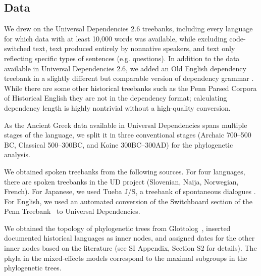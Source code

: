 \documentclass[9pt,twocolumn,twoside,lineno]{pnas-new}
\begin{document}
{%




\subsection*{Data}
We drew on the Universal Dependencies 2.6 treebanks, including every language for which data with at least 10,000 words was available, while excluding code-switched text, text produced entirely by nonnative speakers, and text only reflecting specific types of sentences (e.g. questions).
In addition to the data available in Universal Dependencies 2.6, we added an Old English dependency treebank in a slightly different but comparable version of dependency grammar \citep{bech2014iswoc}.
While there are some other historical treebanks such as the Penn Parsed Corpora of Historical English \citep{kroch2011penn} they are not in the dependency format; calculating dependency length is highly nontrivial without a high-quality conversion.

As the Ancient Greek data available in Universal Dependencies spans multiple stages of the language, we split it in three conventional stages (Archaic 700--500 BC, Classical 500--300BC, and Koine 300BC--300AD) for the phylogenetic analysis. 


We obtained spoken treebanks from the following sources.
For four languages, there are spoken treebanks in the UD project (Slovenian, Naija, Norwegian, French). For Japanese, we used Tueba J/S, a treebank of spontaneous dialogues \citep{hall2006conll}. For English, we used an automated conversion \citep{schuster2018sentences} of the Switchboard section of the Penn Treebank~\citep{marcus-building-1993} to Universal Dependencies.

We obtained the topology of phylogenetic trees from Glottolog~\citep{nordhoff2011glottolog}, inserted documented historical languages as inner nodes, and assigned dates for the other inner nodes based on the literature (see SI Appendix, Section S2 for details).
The phyla in the mixed-effects models correspond to the maximal subgroups in the phylogenetic trees.


}
\end{document}
